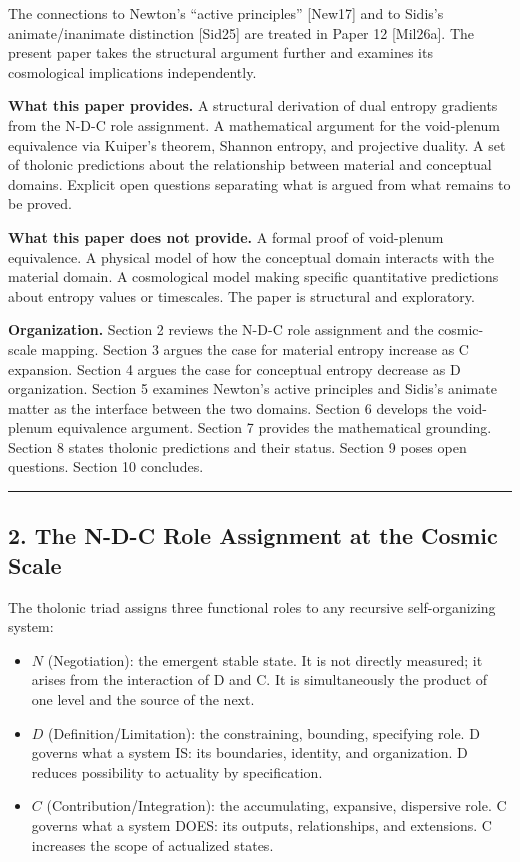 \documentclass[
  11pt,
  letterpaper,
]{article}
\providecommand{\tightlist}{%
  \setlength{\itemsep}{0pt}\setlength{\parskip}{0pt}}
\begin{document}
The connections to Newton's ``active principles'' {[}New17{]} and to
Sidis's animate/inanimate distinction {[}Sid25{]} are treated in Paper
12 {[}Mil26a{]}. The present paper takes the structural argument further
and examines its cosmological implications independently.

\textbf{What this paper provides.} A structural derivation of dual
entropy gradients from the N-D-C role assignment. A mathematical
argument for the void-plenum equivalence via Kuiper's theorem, Shannon
entropy, and projective duality. A set of tholonic predictions about the
relationship between material and conceptual domains. Explicit open
questions separating what is argued from what remains to be proved.

\textbf{What this paper does not provide.} A formal proof of void-plenum
equivalence. A physical model of how the conceptual domain interacts
with the material domain. A cosmological model making specific
quantitative predictions about entropy values or timescales. The paper
is structural and exploratory.

\textbf{Organization.} Section 2 reviews the N-D-C role assignment and
the cosmic-scale mapping. Section 3 argues the case for material entropy
increase as C expansion. Section 4 argues the case for conceptual
entropy decrease as D organization. Section 5 examines Newton's active
principles and Sidis's animate matter as the interface between the two
domains. Section 6 develops the void-plenum equivalence argument.
Section 7 provides the mathematical grounding. Section 8 states tholonic
predictions and their status. Section 9 poses open questions. Section 10
concludes.

\begin{center}\rule{0.5\linewidth}{0.5pt}\end{center}

\subsection{2. The N-D-C Role Assignment at the Cosmic
Scale}\label{the-n-d-c-role-assignment-at-the-cosmic-scale}

The tholonic triad assigns three functional roles to any recursive
self-organizing system:

\begin{itemize}
\tightlist
\item
  \(N\) (Negotiation): the emergent stable state. It is not directly
  measured; it arises from the interaction of D and C. It is
  simultaneously the product of one level and the source of the next.
\item
  \(D\) (Definition/Limitation): the constraining, bounding, specifying
  role. D governs what a system IS: its boundaries, identity, and
  organization. D reduces possibility to actuality by specification.
\item
  \(C\) (Contribution/Integration): the accumulating, expansive,
  dispersive role. C governs what a system DOES: its outputs,
  relationships, and extensions. C increases the scope of actualized
  states.
\end{itemize}
\end{document}
